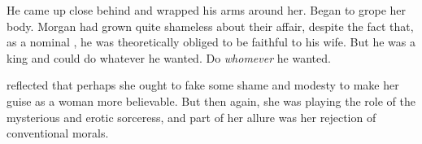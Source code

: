 He came up close behind and wrapped his arms around her. 
Began to grope her body. 
Morgan had grown quite shameless about their affair, despite the fact that, as a nominal \Iquinian, he was theoretically obliged to be faithful to his wife. 
But he was a king and could do whatever he wanted. 
Do \emph{whomever} he wanted. 

\Takestsha{} reflected that perhaps she ought to fake some shame and modesty to make her guise as a \human{} woman more believable. 
But then again, she was playing the role of the mysterious and erotic sorceress, and part of her allure was her rejection of conventional morals. 










